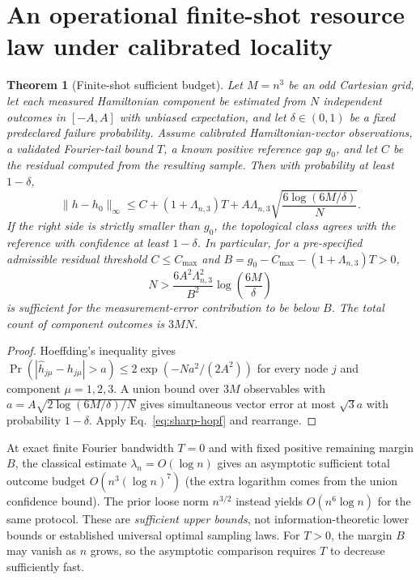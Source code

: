 \documentclass[aps,prd,onecolumn,notitlepage,11pt,superscriptaddress,longbibliography]{revtex4-2}
\newtheorem{theorem}{Theorem}
\begin{document}
\section{An operational finite-shot resource law under calibrated locality}
\begin{theorem}[Finite-shot sufficient budget]
Let $M=n^3$ be an odd Cartesian grid, let each measured Hamiltonian
component be estimated from $N$ independent outcomes in $[-A,A]$
with unbiased expectation, and let
$\delta\in(0,1)$ be a fixed predeclared failure probability.
Assume calibrated Hamiltonian-vector observations, a validated
Fourier-tail bound $T$, a known positive reference gap $g_0$,
and let $C$ be the residual computed from the resulting sample.
Then with probability at least $1-\delta$,
\begin{equation}
\|h-h_0\|_\infty\le
C+(1+\Lambda_{n,3})T+
A\Lambda_{n,3}\sqrt{\frac{6\log(6M/\delta)}N}.
\label{eq:shot-topological}
\end{equation}
If the right side is strictly smaller than $g_0$, the topological
class agrees with the reference with confidence at least
$1-\delta$. In particular, for a pre-specified admissible residual
threshold $C\le C_{\max}$ and
$B=g_0-C_{\max}-(1+\Lambda_{n,3})T>0$,
\begin{equation}
\boxed{N>\frac{6A^2\Lambda_{n,3}^2}{B^2}
\log\left(\frac{6M}{\delta}\right)}
\label{eq:resource-law}
\end{equation}
is sufficient for the measurement-error contribution to be below
$B$. The total count of component outcomes is $3MN$.
\end{theorem}
\begin{proof}
Hoeffding's inequality gives
$\Pr(|\hat h_{j\mu}-h_{j\mu}|>a)
\le2\exp(-Na^2/(2A^2))$ for every node $j$ and component
$\mu=1,2,3$. A union bound over $3M$ observables with
$a=A\sqrt{2\log(6M/\delta)/N}$ gives simultaneous
vector error at most $\sqrt3 a$ with probability $1-\delta$.
Apply Eq.~\eqref{eq:sharp-hopf} and rearrange.
\end{proof}

At exact finite Fourier bandwidth $T=0$ and with fixed positive
remaining margin $B$, the classical estimate
$\lambda_n=O(\log n)$ gives an asymptotic sufficient total outcome
budget $O(n^3(\log n)^7)$ (the extra logarithm comes from the
union confidence bound). The prior loose norm $n^{3/2}$
instead yields $O(n^6\log n)$ for the same protocol. These are
\emph{sufficient upper bounds}, not information-theoretic lower
bounds or established universal optimal sampling laws. For $T>0$,
the margin $B$ may vanish as $n$ grows, so the asymptotic comparison
requires $T$ to decrease sufficiently fast.
\end{document}
